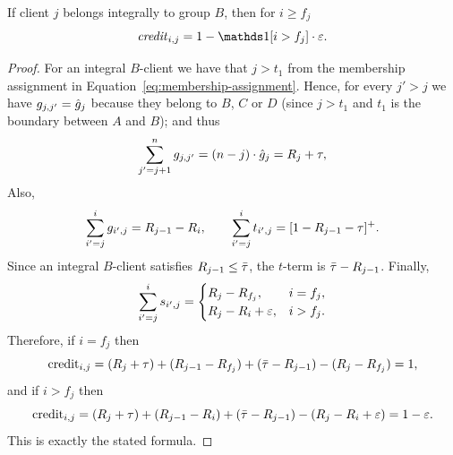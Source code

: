 \begin{lemma}
\label{lem:credit-B-after}
    If client $j$ belongs integrally to group $B$, then for $i \geq f_j$
    \begin{equation*}
        \text{\emph{credit}}_{i,j} = 1 - \ind[i > f_j] \cdot \Mcoeffmone.
    \end{equation*}
\end{lemma}
\begin{proof}
    For an integral $B$-client we have that $j>t_1$ from the membership assignment in Equation~\ref{eq:membership-assignment}. Hence, for every $j' > j$ we have $g_{j,j'} = \hat{g}_j$ because they belong to $B$, $C$ or $D$ (since $j>t_1$ and $t_1$ is the boundary between $A$ and $B$); and thus
    \begin{equation*}
        \sum_{j'=j+1}^n g_{j,j'} = (n-j) \cdot \hat{g}_j = R_j + \tau,
    \end{equation*}
    Also,
    \begin{equation*}
        \sum_{i'=j}^{i} g_{i',j} = R_{j-1}-R_i,
        \qquad
        \sum_{i'=j}^{i} t_{i',j} = [1-R_{j-1}-\tau]^+.
    \end{equation*}
    Since an integral $B$-client satisfies $R_{j-1} \le \bar\tau$, the $t$-term is $\bar\tau-R_{j-1}$.
    Finally,
    \begin{equation*}
        \sum_{i'=j}^{i} s_{i',j} =
        \begin{cases}
            R_j-R_{f_j}, & i=f_j,\\
            R_j-R_i+\varepsilon, & i>f_j.
        \end{cases}
    \end{equation*}
    Therefore, if $i=f_j$ then
    \begin{equation*}
        \text{credit}_{i,j} = (R_j+\tau) + (R_{j-1}-R_{f_j}) + (\bar\tau-R_{j-1}) - (R_j-R_{f_j}) = 1,
    \end{equation*}
    and if $i>f_j$ then
    \begin{equation*}
        \text{credit}_{i,j} = (R_j+\tau) + (R_{j-1}-R_i) + (\bar\tau-R_{j-1}) - (R_j-R_i+\varepsilon) = 1-\varepsilon.
    \end{equation*}
    This is exactly the stated formula.
\end{proof}

